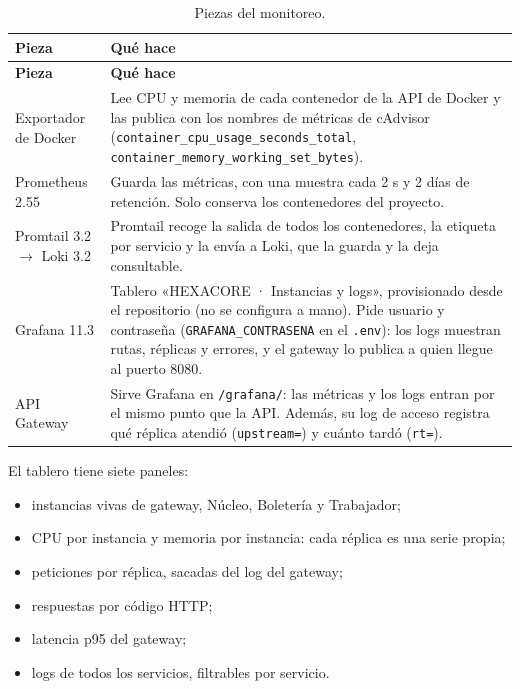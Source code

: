 \begin{center}
\begin{longtable}{|>{\raggedright\arraybackslash}p{3.2cm}|>{\raggedright\arraybackslash}p{10.4cm}|}
\caption{Piezas del monitoreo.}\label{tab:monitoreo-piezas}\\
\hline
\textbf{Pieza} & \textbf{Qué hace}\\
\hline
\endfirsthead
\hline
\textbf{Pieza} & \textbf{Qué hace}\\
\hline
\endhead
Exportador de Docker & Lee CPU y memoria de cada contenedor de la API de Docker y las publica con
los nombres de métricas de cAdvisor (\texttt{container\_cpu\_usage\_seconds\_total},
\texttt{container\_memory\_working\_set\_bytes}).\\
\hline
Prometheus 2.55 & Guarda las métricas, con una muestra cada 2 s y 2 días de retención. Solo
conserva los contenedores del proyecto.\\
\hline
Promtail 3.2 $\rightarrow$ Loki 3.2 & Promtail recoge la salida de todos los contenedores, la
etiqueta por servicio y la envía a Loki, que la guarda y la deja consultable.\\
\hline
Grafana 11.3 & Tablero «HEXACORE · Instancias y logs», provisionado desde el repositorio (no se
configura a mano). Pide usuario y contraseña (\texttt{GRAFANA\_\allowbreak CONTRASENA} en el
\texttt{.env}): los logs muestran rutas, réplicas y errores, y el gateway lo publica a quien
llegue al puerto 8080.\\
\hline
API Gateway & Sirve Grafana en \texttt{/grafana/}: las métricas y los logs entran por el mismo punto
que la API. Además, su log de acceso registra qué réplica atendió (\texttt{upstream=}) y cuánto
tardó (\texttt{rt=}).\\
\hline
\end{longtable}
\end{center}

El tablero tiene siete paneles:
\begin{itemize}[nosep]
\item instancias vivas de gateway, Núcleo, Boletería y Trabajador;
\item CPU por instancia y memoria por instancia: cada réplica es una serie propia;
\item peticiones por réplica, sacadas del log del gateway;
\item respuestas por código HTTP;
\item latencia p95 del gateway;
\item logs de todos los servicios, filtrables por servicio.
\end{itemize}

